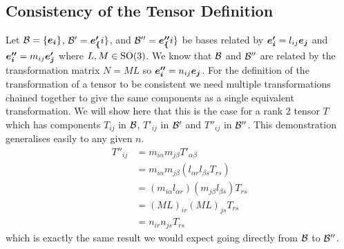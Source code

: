 \subsection{Consistency of the Tensor Definition}
Let \(\mathcal{B} = \{\bm{e_{i}}\}\), \(\mathcal{B}' = {\bm{e'_{\{}}i\}}\), and \(\mathcal{B}'' = \bm{e''_{\{}}i\}\) be bases related by \(\bm{e'_{i}} = l_{ij}\bm{e_{j}}\) and \(\bm{e''_{i}} = m_{ij}\bm{e'_{j}}\) where \(L, M\in\mathrm{SO}(3)\).
We know that \(\mathcal{B}\) and \(\mathcal{B}''\) are related by the transformation matrix \(N = ML\) so \(\bm{e''_{i}} = n_{ij}\bm{e_{j}}\).
For the definition of the transformation of a tensor to be consistent we need multiple transformations chained together to give the same components as a single equivalent transformation.
We will show here that this is the case for a rank 2 tensor \(T\) which has components \(T_{ij}\) in \(\mathcal{B}\), \(T'_{ij}\) in \(\mathcal{B}'\) and \(T''_{ij}\) in \(\mathcal{B}''\).
This demonstration generalises easily to any given \(n\).
\begin{align*}
    T''_{ij} &= m_{i\alpha} m_{j\beta} T'_{\alpha\beta}\\
    &= m_{i\alpha}m_{j\beta} (l_{\alpha r}l_{\beta s}T_{rs})\\
    &= (m_{i\alpha}l_{\alpha r})(m_{j\beta}l_{\beta s}) T_{rs}\\
    &= (ML)_{ir}(ML)_{js} T_{rs}\\
    &= n_{ir}n_{js}T_{rs}
\end{align*}
which is exactly the same result we would expect going directly from \(\mathcal{B}\) to \(\mathcal{B}''\).

